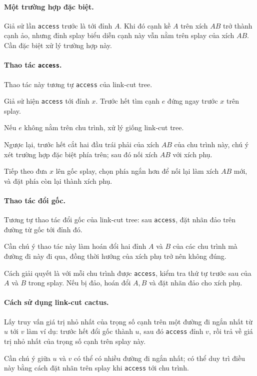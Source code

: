 \documentclass[11pt]{article}
\begin{document}
\paragraph{Một trường hợp đặc biệt.}
Giả sử lần \texttt{access} trước là tới đỉnh \(A\). Khi đó cạnh kề \(A\) trên
xích \(AB\) trở thành cạnh ảo, nhưng đỉnh splay biểu diễn cạnh này vẫn nằm trên
splay của xích \(AB\). Cần đặc biệt xử lý trường hợp này.

\paragraph{Thao tác \texttt{access}.}
Thao tác này tương tự \texttt{access} của link-cut tree.

Giả sử hiện \texttt{access} tới đỉnh \(x\). Trước hết tìm cạnh \(e\) đứng ngay
trước \(x\) trên splay.

Nếu \(e\) không nằm trên chu trình, xử lý giống link-cut tree.

Ngược lại, trước hết cắt hai đầu trái phải của xích \(AB\) của chu trình này,
chú ý xét trường hợp đặc biệt phía trên; sau đó nối xích \(AB\) với xích phụ.

Tiếp theo đưa \(x\) lên gốc splay, chọn phía ngắn hơn để nối lại làm xích
\(AB\) mới, và đặt phía còn lại thành xích phụ.

\paragraph{Thao tác đổi gốc.}
Tương tự thao tác đổi gốc của link-cut tree: sau \texttt{access}, đặt nhãn đảo
trên đường từ gốc tới đỉnh đó.

Cần chú ý thao tác này làm hoán đổi hai đỉnh \(A\) và \(B\) của các chu trình
mà đường đi này đi qua, đồng thời hướng của xích phụ trở nên không đúng.

Cách giải quyết là với mỗi chu trình được \texttt{access}, kiểm tra thứ tự
trước sau của \(A\) và \(B\) trong splay. Nếu bị đảo, hoán đổi \(A,B\) và đặt
nhãn đảo cho xích phụ.

\paragraph{Cách sử dụng link-cut cactus.}
Lấy truy vấn giá trị nhỏ nhất của trọng số cạnh trên một đường đi ngắn nhất từ
\(u\) tới \(v\) làm ví dụ: trước hết đổi gốc thành \(u\), sau đó
\texttt{access} đỉnh \(v\), rồi trả về giá trị nhỏ nhất của trọng số cạnh trên
splay này.

Cần chú ý giữa \(u\) và \(v\) có thể có nhiều đường đi ngắn nhất; có thể duy
trì điều này bằng cách đặt nhãn trên splay khi \texttt{access} tới chu trình.
\end{document}
